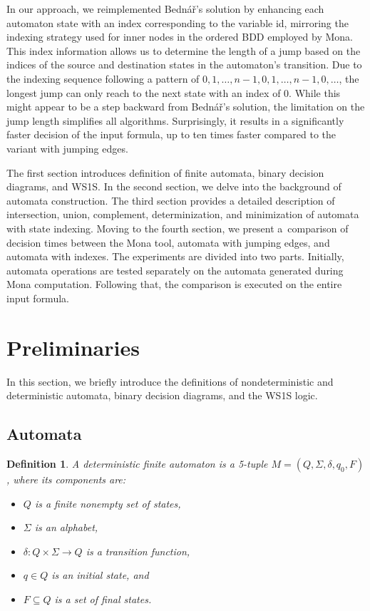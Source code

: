 \documentclass[pdflatex,sn-mathphys-num]{sn-jnl}%
\theoremstyle{thmstyleone}%
\theoremstyle{thmstyletwo}%
\theoremstyle{thmstylethree}%
\newtheorem{definition}{Definition}%
\begin{document}
    In our approach, we reimplemented Bednář's solution by enhancing each automaton state with an index corresponding to the variable id, mirroring the indexing strategy used for inner nodes in the ordered BDD employed by Mona. This index information allows us to determine the length of a jump based on the indices of the source and destination states in the automaton's transition. Due to the indexing sequence following a pattern of $0, 1, \dots, n-1, 0, 1, \dots, n-1, 0, \dots$, the longest jump can only reach to the next state with an index of $0$. While this might appear to be a step backward from Bednář's solution, the limitation on the jump length simplifies all algorithms. Surprisingly, it results in a significantly faster decision of the input formula, up to ten times faster compared to the variant with jumping edges.

    The first section introduces definition of finite automata, binary decision diagrams, and WS1S. In the second section, we delve into the background of automata construction. The third section provides a detailed description of intersection, union, complement, determinization, and minimization of automata with state indexing. Moving to the fourth section, we present a~comparison of decision times between the Mona tool, automata with jumping edges, and automata with indexes. The experiments are divided into two parts. Initially, automata operations are tested separately on the automata generated during Mona computation. Following that, the comparison is executed on the entire input formula.


\section{Preliminaries}
    In this section, we briefly introduce the definitions of nondeterministic and deterministic automata, binary decision diagrams, and the WS1S logic.

    \subsection{Automata}

        \begin{definition}
            A deterministic finite automaton is a 5-tuple $M = (Q, \Sigma, \delta, q_0, F)$, where its components are:
            \begin{itemize}[noindent]
                \item $Q$ is a finite nonempty set of states,
                \item $\Sigma$ is an alphabet,
                \item $\delta : Q \times \Sigma \rightarrow Q$ is a transition function,
                \item $q \in Q$ is an initial state, and
                \item $F \subseteq Q$ is a set of final states.
            \end{itemize}
        \end{definition}
\end{document}

